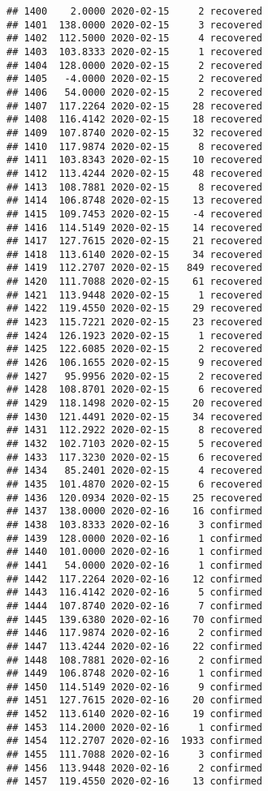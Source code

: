 \documentclass[
]{article}
\begin{document}
\begin{verbatim}
## 1400    2.0000 2020-02-15     2 recovered
## 1401  138.0000 2020-02-15     3 recovered
## 1402  112.5000 2020-02-15     4 recovered
## 1403  103.8333 2020-02-15     1 recovered
## 1404  128.0000 2020-02-15     2 recovered
## 1405   -4.0000 2020-02-15     2 recovered
## 1406   54.0000 2020-02-15     2 recovered
## 1407  117.2264 2020-02-15    28 recovered
## 1408  116.4142 2020-02-15    18 recovered
## 1409  107.8740 2020-02-15    32 recovered
## 1410  117.9874 2020-02-15     8 recovered
## 1411  103.8343 2020-02-15    10 recovered
## 1412  113.4244 2020-02-15    48 recovered
## 1413  108.7881 2020-02-15     8 recovered
## 1414  106.8748 2020-02-15    13 recovered
## 1415  109.7453 2020-02-15    -4 recovered
## 1416  114.5149 2020-02-15    14 recovered
## 1417  127.7615 2020-02-15    21 recovered
## 1418  113.6140 2020-02-15    34 recovered
## 1419  112.2707 2020-02-15   849 recovered
## 1420  111.7088 2020-02-15    61 recovered
## 1421  113.9448 2020-02-15     1 recovered
## 1422  119.4550 2020-02-15    29 recovered
## 1423  115.7221 2020-02-15    23 recovered
## 1424  126.1923 2020-02-15     1 recovered
## 1425  122.6085 2020-02-15     2 recovered
## 1426  106.1655 2020-02-15     9 recovered
## 1427   95.9956 2020-02-15     2 recovered
## 1428  108.8701 2020-02-15     6 recovered
## 1429  118.1498 2020-02-15    20 recovered
## 1430  121.4491 2020-02-15    34 recovered
## 1431  112.2922 2020-02-15     8 recovered
## 1432  102.7103 2020-02-15     5 recovered
## 1433  117.3230 2020-02-15     6 recovered
## 1434   85.2401 2020-02-15     4 recovered
## 1435  101.4870 2020-02-15     6 recovered
## 1436  120.0934 2020-02-15    25 recovered
## 1437  138.0000 2020-02-16    16 confirmed
## 1438  103.8333 2020-02-16     3 confirmed
## 1439  128.0000 2020-02-16     1 confirmed
## 1440  101.0000 2020-02-16     1 confirmed
## 1441   54.0000 2020-02-16     1 confirmed
## 1442  117.2264 2020-02-16    12 confirmed
## 1443  116.4142 2020-02-16     5 confirmed
## 1444  107.8740 2020-02-16     7 confirmed
## 1445  139.6380 2020-02-16    70 confirmed
## 1446  117.9874 2020-02-16     2 confirmed
## 1447  113.4244 2020-02-16    22 confirmed
## 1448  108.7881 2020-02-16     2 confirmed
## 1449  106.8748 2020-02-16     1 confirmed
## 1450  114.5149 2020-02-16     9 confirmed
## 1451  127.7615 2020-02-16    20 confirmed
## 1452  113.6140 2020-02-16    19 confirmed
## 1453  114.2000 2020-02-16     1 confirmed
## 1454  112.2707 2020-02-16  1933 confirmed
## 1455  111.7088 2020-02-16     3 confirmed
## 1456  113.9448 2020-02-16     2 confirmed
## 1457  119.4550 2020-02-16    13 confirmed

\end{verbatim}
\end{document}
